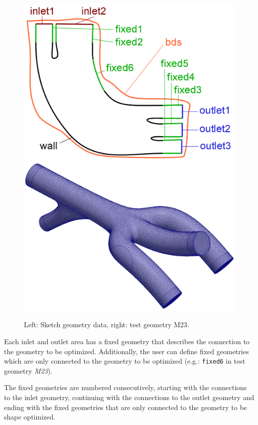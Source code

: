 \documentclass[a4paper,oneside]{book}
\numberwithin{equation}{section}
\begin{document}
\begin{figure}[htbp]
    \centering
    \includegraphics[scale=0.55]{skizze_designSpace4.png}
    \includegraphics[scale=0.18]{M23all.png}   
    \caption{Left: Sketch geometry data, right: test geometry M23.} 
    \label{fig:sketch building space}
\end{figure}
Each inlet and outlet area has a fixed geometry that describes the connection to the geometry to be optimized. Additionally, the user can define fixed geometries which are only connected to the geometry to be optimized (e.g.: \texttt{fixed6} in test geometry \textit{M23}).

The fixed geometries are numbered consecutively, starting with the connections to the inlet geometry, continuing with the connections to the outlet geometry and ending with the fixed geometries that are only connected to the geometry to be shape optimized.
\end{document}
